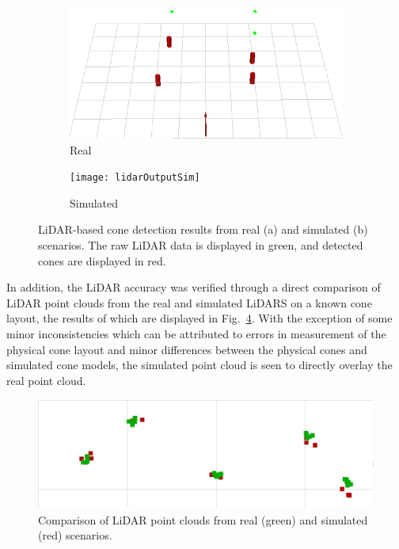 \begin{figure}[H]
	\centering
	\begin{subfigure}[b]{0.45\textwidth}
		\includegraphics[width=\textwidth]{lidarOutputReal}
		\caption{Real}
		\label{fig:8:lidarOutputs:real}   
	\end{subfigure} 
	\hspace{1em}         
	\begin{subfigure}[b]{0.45\textwidth}
		\texttt{[image: lidarOutputSim]}
		\caption{Simulated}
		\label{fig:8:lidarOutputs:sim}
	\end{subfigure}             
	\caption[LiDAR-based cone detection results from real and simulated scenarios]{LiDAR-based cone detection results from real (a) and simulated (b) scenarios. The raw LiDAR data is displayed in green, and detected cones are displayed in red.}
	\label{fig:8:lidarOutputs}
\end{figure}

In addition, the LiDAR accuracy was verified through a direct comparison of LiDAR point clouds from the real and simulated LiDARS on a known cone layout, the results of which are displayed in Fig.~\ref{fig:8:lidarComparison}.
With the exception of some minor inconsistencies which can be attributed to errors in measurement of the physical cone layout and minor differences between the physical cones and simulated cone models, the simulated point cloud is seen to directly overlay the real point cloud.

\begin{figure}[!ht] %
	\centering
	\includegraphics[width=0.8\columnwidth]{lidarComparison}
	\caption[LiDAR point clouds from read and simulated scenarios]{Comparison of LiDAR point clouds from real (green) and simulated (red) scenarios.}
	\label{fig:8:lidarComparison}
\end{figure}

